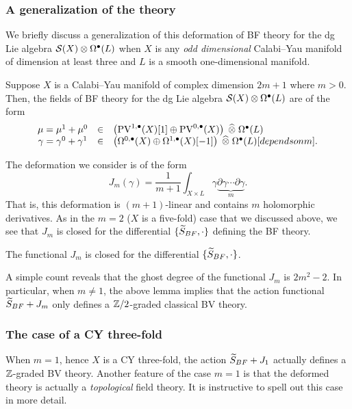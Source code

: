 \documentclass[11pt]{amsart}
\def\pv{{\rm PV}}
\begin{document}
\subsubsection{A generalization of the theory}

We briefly discuss a generalization of this deformation of BF theory for the dg Lie algebra $\cS(X) \otimes \Omega^\bu(L)$ when $X$ is any {\em odd dimensional} Calabi--Yau manifold of dimension at least three and $L$ is a smooth one-dimensional manifold.

Suppose $X$ is a Calabi--Yau manifold of complex dimension $2m+1$ where $m > 0$.
Then, the fields of BF theory for the dg Lie algebra $\cS(X) \otimes \Omega^{\bu}(L)$ are of the form
\[
  \begin{array}{ccl}
    \mu = \mu^1+\mu^0 & \in & \left(\pv^{1,\bu}(X)[1] \oplus \pv^{0,\bu}(X) \right) \; \Hat{\otimes} \; \Omega^{\bu}(L) \\
    \gamma = \gamma^0 + \gamma^1 & \in & \left(\Omega^{0,\bu}(X) \oplus \Omega^{1,\bu}(X)[-1] \right) \; \Hat{\otimes}\; \Omega^{\bu}(L)[depends on m] .
  \end{array}
\]

The deformation we consider is of the form
\[
  J_m (\gamma) = \frac{1}{m+1} \int_{X \times L} \gamma \underbrace{\partial \gamma \cdots \partial \gamma}_{m} .
\]
That is, this deformation is $(m+1)$-linear and contains $m$ holomorphic derivatives.
As in the $m=2$ ($X$ is a five-fold) case that we discussed above, we see that $J_m$ is closed for the differential $\{\Tilde{S}_{BF},\cdot\}$ defining the BF theory.

\begin{lem}
  The functional $J_m$ is closed for the differential $\{\Tilde{S}_{BF}, \cdot \}$.
\end{lem}

A simple count reveals that the ghost degree of the functional $J_m$ is $2m^2 - 2$.
In particular, when $m \ne 1$, the above lemma implies that the action functional $\Tilde{S}_{BF} + J_m$ only defines a $\ZZ/2$-graded classical BV theory.

\subsubsection{The case of a CY three-fold}

When $m=1$, hence $X$ is a CY three-fold, the action $\Tilde{S}_{BF} + J_1$ actually defines a $\ZZ$-graded BV theory.
Another feature of the case $m=1$ is that the deformed theory is actually a {\em topological} field theory.
It is instructive to spell out this case in more detail.
\end{document}
